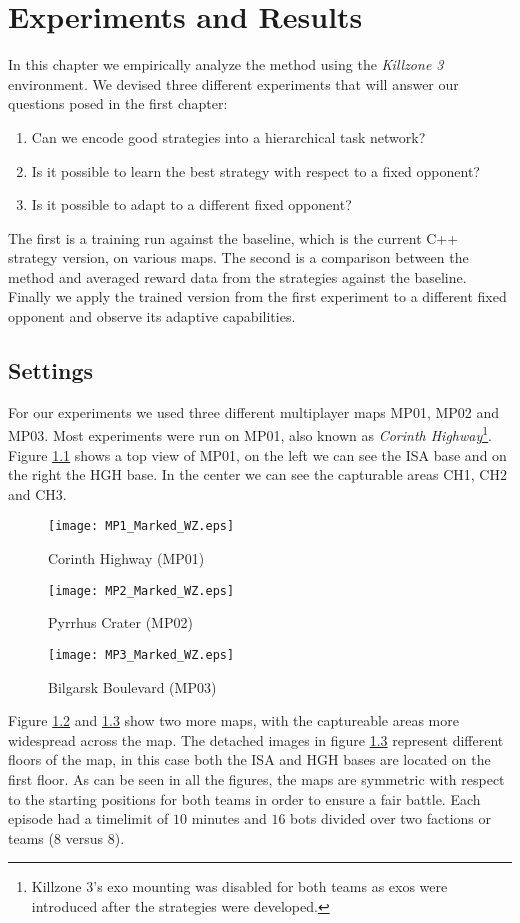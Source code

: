 \chapter{Experiments and Results} %
\label{Chapter6}  %
In this chapter we empirically analyze the method using the \emph{Killzone 3}
environment. We devised three different experiments that will answer our
questions posed in the first chapter:
\begin{enumerate}
\item{Can we encode good strategies into a hierarchical task network?}
\item{Is it possible to learn the best strategy with respect to a fixed opponent?}
\item{Is it possible to adapt to a different fixed opponent?} 
\end{enumerate}
The first is a training run against the baseline, which is the current C++
strategy version, on various maps. The second is a comparison between the
method and averaged reward data from the strategies against the baseline.
Finally we apply the trained version from the first experiment to a different
fixed opponent and observe its adaptive capabilities.


\section{Settings}
For our experiments we used three different multiplayer maps MP01, MP02 and
MP03. Most experiments were run on MP01, also known as \emph{Corinth
Highway}\footnote{Killzone 3's exo mounting was disabled for both teams as exos
were introduced after the strategies were developed.}. Figure \ref{fig:mp01}
shows a top view of MP01, on the left we can see the ISA base and on the right
the HGH base. In the center we can see the capturable areas CH1, CH2 and CH3.
\begin{figure}[!ht]
\centering
\texttt{[image: MP1\_Marked\_WZ.eps]}
\caption{Corinth Highway (MP01)}
\label{fig:mp01}
\end{figure}
\begin{figure}[!ht]
\centering
\texttt{[image: MP2\_Marked\_WZ.eps]}
\caption{Pyrrhus Crater (MP02)}
\label{fig:mp02}
\end{figure}
\begin{figure}[!ht]
\centering
\texttt{[image: MP3\_Marked\_WZ.eps]}
\caption{Bilgarsk Boulevard (MP03)}
\label{fig:mp03}
\end{figure}
Figure \ref{fig:mp02} and \ref{fig:mp03} show two more maps, with the
captureable areas more widespread across the map. The detached images in figure
\ref{fig:mp03} represent different floors of the map, in this case both the ISA
and HGH bases are located on the first floor.  As can be seen in all the
figures, the maps are symmetric with respect to the starting positions for both
teams in order to ensure a fair battle.  Each episode had a timelimit of $10$
minutes and $16$ bots divided over two factions or teams ($8$ versus $8$).


